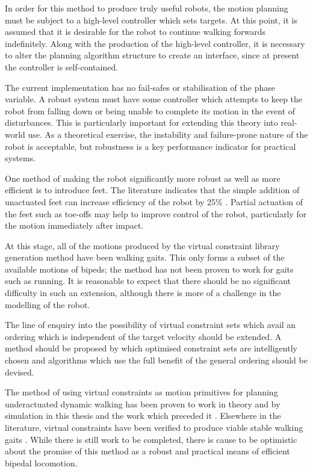 In order for this method to produce truly useful robots, the motion planning must be subject to a high-level controller which sets targets. At this point, it is assumed that it is desirable for the robot to continue walking forwards indefinitely. Along with the production of the high-level controller, it is necessary to alter the planning algorithm structure to create an interface, since at present the controller is self-contained.

The current implementation has no fail-safes or stabilisation of the phase variable. A robust system must have some controller which attempts to keep the robot from falling down or being unable to complete its motion in the event of disturbances. This is particularly important for extending this theory into real-world use. As a theoretical exercise, the instability and failure-prone nature of the robot is acceptable, but robustness is a key performance indicator for practical systems.

One method of making the robot significantly more robust as well as more efficient is to introduce feet. The literature indicates that the simple addition of unactuated feet can increase efficiency of the robot by 25\% \cite{asano2007dynamic}. Partial actuation of the feet such as toe-offs may help to improve control of the robot, particularly for the motion immediately after impact.

At this stage, all of the motions produced by the virtual constraint library generation method have been walking gaits. This only forms a subset of the available motions of bipeds; the method has not been proven to work for gaits such as running. It is reasonable to expect that there should be no significant difficulty in such an extension, although there is more of a challenge in the modelling of the robot.

The line of enquiry into the possibility of virtual constraint sets which avail an ordering which is independent of the target velocity should be extended. A method should be proposed by which optimised constraint sets are intelligently chosen and algorithms which use the full benefit of the general ordering should be devised.

The method of using virtual constraints as motion primitives for planning underactuated dynamic walking has been proven to work in theory and by simulation in this thesis and the work which preceded it \cite{manchester13planning}. Elsewhere in the literature, virtual constraints have been verified to produce viable stable walking gaits \cite{byl2008approximate, sreenath2011compliant}. While there is still work to be completed, there is cause to be optimistic about the promise of this method as a robust and practical means of efficient bipedal locomotion.